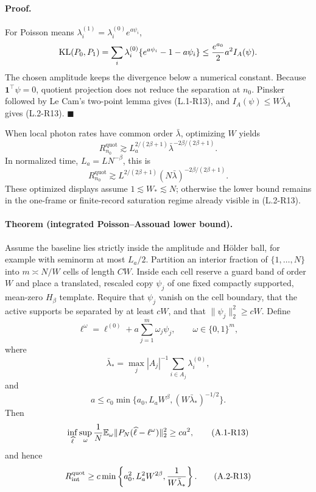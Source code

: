 \paragraph{Proof.}
For Poisson means
$\lambda_i^{(1)}=\lambda_i^{(0)}e^{a\psi_i}$,
\[
 \operatorname{KL}(P_0,P_1)
 =\sum_i\lambda_i^{(0)}
   \{e^{a\psi_i}-1-a\psi_i\}
 \le {e^{a_0}\over2}a^2I_A(\psi).
\]
The chosen amplitude keeps the divergence below a numerical constant.
Because $\mathbf1^\top\psi=0$, quotient projection does not reduce the
separation at $n_0$.  Pinsker followed by Le Cam's two-point lemma gives
(L.1-R13), and $I_A(\psi)\le W\bar\lambda_A$ gives (L.2-R13).
\hfill$\blacksquare$

When local photon rates have common order $\bar\lambda$, optimizing
$W$ yields
\[
 R_{n_0}^{\mathrm{quot}}
 \gtrsim L_a^{2/(2\beta+1)}
          \bar\lambda^{-2\beta/(2\beta+1)}.
\]
In normalized time, $L_a=LN^{-\beta}$, this is
\[
 R_{n_0}^{\mathrm{quot}}
 \gtrsim L^{2/(2\beta+1)}
 (N\bar\lambda)^{-2\beta/(2\beta+1)}.
\]
These optimized displays assume $1\lesssim W_*\lesssim N$; otherwise
the lower bound remains in the one-frame or finite-record saturation
regime already visible in (L.2-R13).

\paragraph{Theorem (integrated Poisson--Assouad lower bound).}
Assume the baseline lies strictly inside the amplitude and H\"older
ball, for example with seminorm at most $L_a/2$.  Partition an interior
fraction of $\{1,\ldots,N\}$ into $m\asymp N/W$ cells of length $CW$.
Inside each cell reserve a guard band of order $W$ and place a translated,
rescaled copy $\psi_j$ of one fixed compactly supported, mean-zero
$H_\beta$ template.  Require that $\psi_j$ vanish on the cell boundary,
that the active supports be separated by at least $cW$, and that
$\|\psi_j\|_2^2\ge cW$.  Define
\[
 \ell^\omega=\ell^{(0)}
 +a\sum_{j=1}^m\omega_j\psi_j,
 \qquad \omega\in\{0,1\}^m,
\]
where
\[
 \bar\lambda_*=\max_j |A_j|^{-1}
  \sum_{i\in A_j}\lambda_i^{(0)},
\]
and
\[
 a\le c_0\min\{a_0,L_aW^\beta,(W\bar\lambda_*)^{-1/2}\}.
\]
Then
\begin{equation}
 \inf_{\widehat\ell}\sup_\omega
 {1\over N}\mathbb E_\omega
 \|P_N(\widehat\ell-\ell^\omega)\|_2^2
 \ge ca^2, \tag{A.1-R13}
\end{equation}
and hence
\begin{equation}
 R_{\mathrm{int}}^{\mathrm{quot}}
 \ge c\min\left\{a_0^2,L_a^2W^{2\beta},
                   {1\over W\bar\lambda_*}\right\}. \tag{A.2-R13}
\end{equation}

